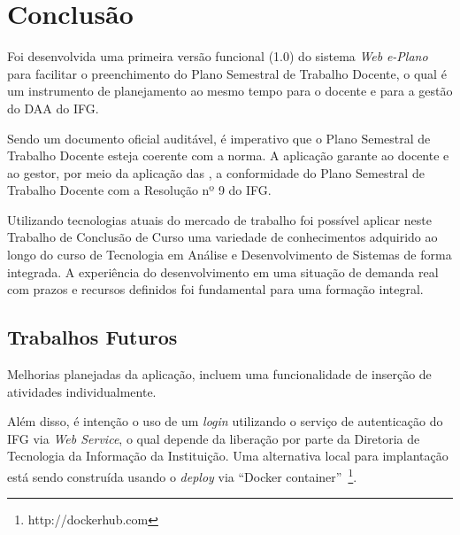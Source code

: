 \chapter{Conclusão}
\label{Conclusao}


Foi desenvolvida uma primeira versão funcional (1.0) do sistema \textit{Web} \textit{e-Plano} para facilitar o preenchimento do Plano Semestral de Trabalho Docente, o qual é um instrumento de planejamento ao mesmo tempo para o docente e para a gestão do \acf{DAA} do \ac{IFG}.

Sendo um documento oficial auditável, é imperativo que o Plano Semestral de Trabalho Docente esteja coerente com a norma.
A aplicação garante ao docente e ao gestor, por meio da aplicação das , a conformidade do Plano Semestral de Trabalho Docente com a Resolução nº 9 do \ac{IFG}.

Utilizando tecnologias atuais do mercado de trabalho foi possível aplicar neste Trabalho de Conclusão de Curso uma variedade de conhecimentos adquirido ao longo do curso de Tecnologia em Análise e Desenvolvimento de Sistemas de forma integrada.
A experiência do desenvolvimento em uma situação de demanda real com prazos e recursos definidos foi fundamental para uma formação integral.

\section{Trabalhos Futuros}

Melhorias planejadas da aplicação, incluem uma funcionalidade de inserção de atividades individualmente.

Além disso, é intenção o uso de um \textit{login} utilizando o serviço de autenticação do IFG via \textit{Web Service}, o qual depende da liberação por parte da Diretoria de Tecnologia da Informação da Instituição.
Uma alternativa local para implantação está sendo construída usando o \textit{deploy} via ``Docker container''~\footnote{http://dockerhub.com}.